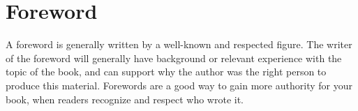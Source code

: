 \documentclass[../workbook]{subfiles}
\begin{document}
{}%

\section*{Foreword}

\parbox{\textwidth}{

    \raggedright
    \setlength{\parskip}{1.25em}

    \par{
        A foreword is generally written by a well-known and respected figure.
        The writer of the foreword will generally have background or relevant experience with the topic of the book, and
        can support why the author was the right person to produce this material.
        Forewords are a good way to gain more authority for your book, when readers recognize and respect who wrote it.
    }
}
\end{document}
